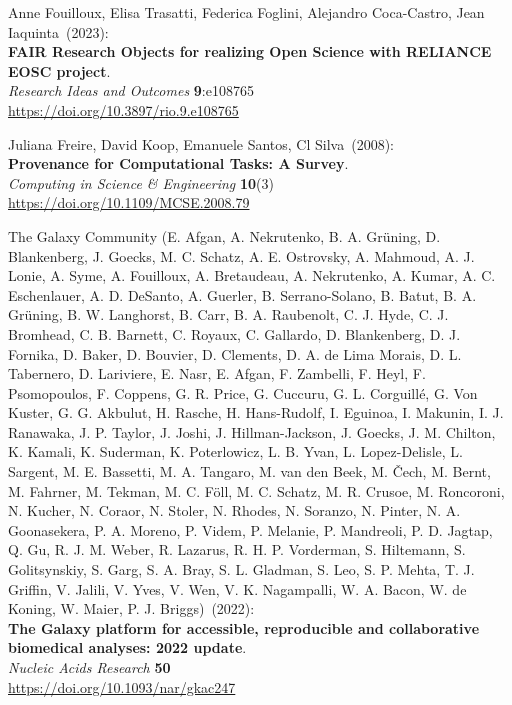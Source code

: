 \begin{thebibliography}{9}
Anne Fouilloux, Elisa Trasatti, Federica Foglini, Alejandro Coca-Castro, Jean Iaquinta~(2023): \\
\textbf{FAIR Research Objects for realizing Open Science with RELIANCE EOSC project}.\\
\emph{Research Ideas and Outcomes} \textbf{9}:e108765 \\
\url{https://doi.org/10.3897/rio.9.e108765}

Juliana Freire, David Koop, Emanuele Santos, Cl Silva~(2008): \\
\textbf{Provenance for Computational Tasks: A Survey}.\\
\emph{Computing in Science \& Engineering} \textbf{10}(3) \\
\url{https://doi.org/10.1109/MCSE.2008.79}

The Galaxy Community (E. Afgan, A. Nekrutenko, B. A. Grüning, D. Blankenberg, J. Goecks, M. C. Schatz, A. E. Ostrovsky, A. Mahmoud, A. J. Lonie, A. Syme, A. Fouilloux, A. Bretaudeau, A. Nekrutenko, A. Kumar, A. C. Eschenlauer, A. D. DeSanto, A. Guerler, B. Serrano-Solano, B. Batut, B. A. Grüning, B. W. Langhorst, B. Carr, B. A. Raubenolt, C. J. Hyde, C. J. Bromhead, C. B. Barnett, C. Royaux, C. Gallardo, D. Blankenberg, D. J. Fornika, D. Baker, D. Bouvier, D. Clements, D. A. de Lima Morais, D. L. Tabernero, D. Lariviere, E. Nasr, E. Afgan, F. Zambelli, F. Heyl, F. Psomopoulos, F. Coppens, G. R. Price, G. Cuccuru, G. L. Corguillé, G. Von Kuster, G. G. Akbulut, H. Rasche, H. Hans-Rudolf, I. Eguinoa, I. Makunin, I. J. Ranawaka, J. P. Taylor, J. Joshi, J. Hillman-Jackson, J. Goecks, J. M. Chilton, K. Kamali, K. Suderman, K. Poterlowicz, L. B. Yvan, L. Lopez-Delisle, L. Sargent, M. E. Bassetti, M. A. Tangaro, M. van den Beek, M. Čech, M. Bernt, M. Fahrner, M. Tekman, M. C. Föll, M. C. Schatz, M. R. Crusoe, M. Roncoroni, N. Kucher, N. Coraor, N. Stoler, N. Rhodes, N. Soranzo, N. Pinter, N. A. Goonasekera, P. A. Moreno, P. Videm, P. Melanie, P. Mandreoli, P. D. Jagtap, Q. Gu, R. J. M. Weber, R. Lazarus, R. H. P. Vorderman, S. Hiltemann, S. Golitsynskiy, S. Garg, S. A. Bray, S. L. Gladman, S. Leo, S. P. Mehta, T. J. Griffin, V. Jalili, V. Yves, V. Wen, V. K. Nagampalli, W. A. Bacon, W. de Koning, W. Maier, P. J. Briggs)~(2022): \\
\textbf{The Galaxy platform for accessible, reproducible and collaborative biomedical analyses: 2022 update}.\\
\emph{Nucleic Acids Research} \textbf{50}\\
\url{https://doi.org/10.1093/nar/gkac247}


\end{thebibliography}
